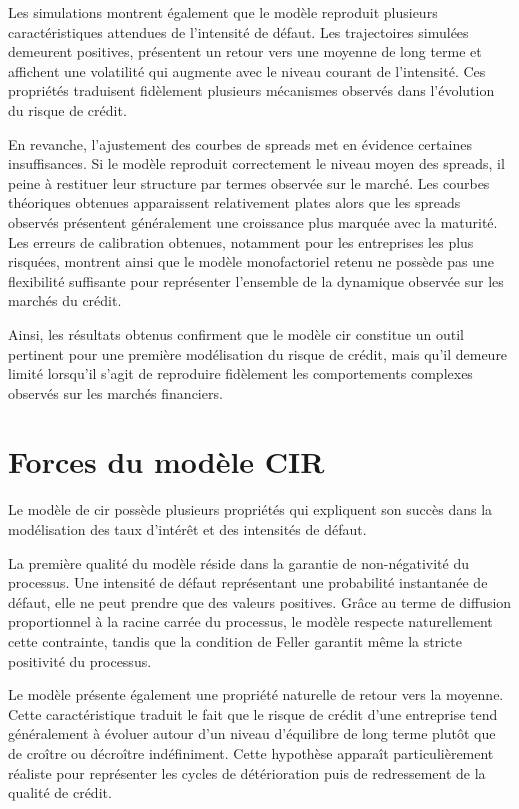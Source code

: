 Les simulations montrent également que le modèle reproduit plusieurs caractéristiques attendues de l'intensité de défaut. Les trajectoires simulées demeurent positives, présentent un retour vers une moyenne de long terme et affichent une volatilité qui augmente avec le niveau courant de l'intensité. Ces propriétés traduisent fidèlement plusieurs mécanismes observés dans l'évolution du risque de crédit.

En revanche, l'ajustement des courbes de spreads met en évidence certaines insuffisances. Si le modèle reproduit correctement le niveau moyen des spreads, il peine à restituer leur structure par termes observée sur le marché. Les courbes théoriques obtenues apparaissent relativement plates alors que les spreads observés présentent généralement une croissance plus marquée avec la maturité. Les erreurs de calibration obtenues, notamment pour les entreprises les plus risquées, montrent ainsi que le modèle monofactoriel retenu ne possède pas une flexibilité suffisante pour représenter l'ensemble de la dynamique observée sur les marchés du crédit.

Ainsi, les résultats obtenus confirment que le modèle \gls{cir} constitue un outil pertinent pour une première modélisation du risque de crédit, mais qu'il demeure limité lorsqu'il s'agit de reproduire fidèlement les comportements complexes observés sur les marchés financiers.


\section{Forces du modèle CIR}

Le modèle de \gls{cir} possède plusieurs propriétés qui expliquent son succès dans la modélisation des taux d'intérêt et des intensités de défaut.

La première qualité du modèle réside dans la garantie de non-négativité du processus. Une intensité de défaut représentant une probabilité instantanée de défaut, elle ne peut prendre que des valeurs positives. Grâce au terme de diffusion proportionnel à la racine carrée du processus, le modèle respecte naturellement cette contrainte, tandis que la condition de Feller garantit même la stricte positivité du processus.

Le modèle présente également une propriété naturelle de retour vers la moyenne. Cette caractéristique traduit le fait que le risque de crédit d'une entreprise tend généralement à évoluer autour d'un niveau d'équilibre de long terme plutôt que de croître ou décroître indéfiniment. Cette hypothèse apparaît particulièrement réaliste pour représenter les cycles de détérioration puis de redressement de la qualité de crédit.

